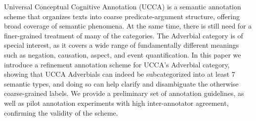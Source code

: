 Universal Conceptual Cognitive Annotation (UCCA) is a semantic annotation scheme that organizes texts into coarse predicate-argument structure, offering broad coverage of semantic phenomena. At the same time, there is still need for a finer-grained treatment of many of the categories. The Adverbial category is of special interest, as it covers a wide range of fundamentally different meanings such as negation, causation, aspect, and event quantification. In this paper we introduce a refinement annotation scheme for UCCA's Adverbial category, showing that UCCA Adverbials can indeed be subcategorized into at least 7 semantic types, and doing so can help clarify and disambiguate the otherwise coarse-grained labels. We provide a preliminary set of annotation guidelines, as well as pilot annotation experiments with high inter-annotator agreement, confirming the validity of the scheme.
